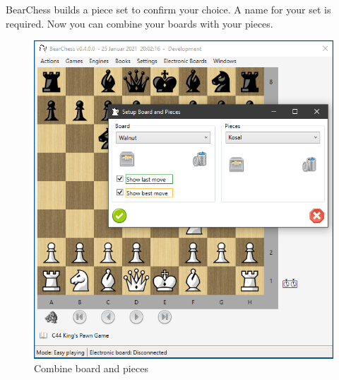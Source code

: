 \documentclass[11pt,a4paper]{article}
\begin{document}
BearChess builds a piece set to confirm your choice. A name for your set is required.
Now you can combine your boards with your pieces.

\begin{figure}[H]
	\centering
	\includegraphics[scale=0.8]{CombineBoardPieces.png}
	\caption{Combine board and pieces }
	\label{fig:CombineBoardPieces}
\end{figure}
\end{document}
